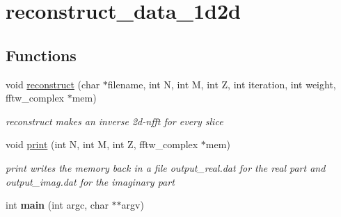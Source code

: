 \hypertarget{group__applications__mri3d__reconstruct__data__1d2d}{
\section{reconstruct\_\-data\_\-1d2d}
\label{group__applications__mri3d__reconstruct__data__1d2d}
}
\subsection*{Functions}
\begin{CompactItemize}
\item 
\hypertarget{group__applications__mri3d__reconstruct__data__1d2d_ga0}{
void \hyperlink{group__applications__mri3d__reconstruct__data__1d2d_ga0}{reconstruct} (char $\ast$filename, int N, int M, int Z, int iteration, int weight, fftw\_\-complex $\ast$mem)}
\label{group__applications__mri3d__reconstruct__data__1d2d_ga0}

\begin{CompactList}\small\item\em reconstruct makes an inverse 2d-nfft for every slice \item\end{CompactList}\item 
\hypertarget{group__applications__mri3d__reconstruct__data__1d2d_ga1}{
void \hyperlink{group__applications__mri3d__reconstruct__data__1d2d_ga1}{print} (int N, int M, int Z, fftw\_\-complex $\ast$mem)}
\label{group__applications__mri3d__reconstruct__data__1d2d_ga1}

\begin{CompactList}\small\item\em print writes the memory back in a file output\_\-real.dat for the real part and output\_\-imag.dat for the imaginary part \item\end{CompactList}\item 
\hypertarget{group__applications__mri3d__reconstruct__data__1d2d_ga2}{
int {\bf main} (int argc, char $\ast$$\ast$argv)}
\label{group__applications__mri3d__reconstruct__data__1d2d_ga2}

\end{CompactItemize}
